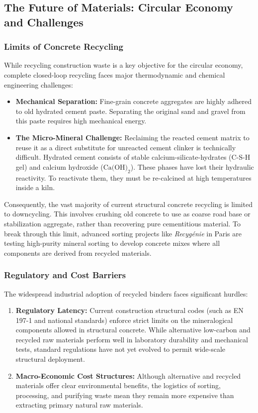 \subsection{The Future of Materials: Circular Economy and Challenges}

\subsubsection{Limits of Concrete Recycling}
While recycling construction waste is a key objective for the circular economy, complete closed-loop recycling faces major thermodynamic and chemical engineering challenges:
\begin{itemize}
    \item \textbf{Mechanical Separation:} Fine-grain concrete aggregates are highly adhered to old hydrated cement paste. Separating the original sand and gravel from this paste requires high mechanical energy.
    \item \textbf{The Micro-Mineral Challenge:} Reclaiming the reacted cement matrix to reuse it as a direct substitute for unreacted cement clinker is technically difficult. Hydrated cement consists of stable calcium-silicate-hydrates ($\text{C-S-H}$ gel) and calcium hydroxide ($\text{Ca(OH)}_2$). These phases have lost their hydraulic reactivity. To reactivate them, they must be re-calcined at high temperatures inside a kiln.
\end{itemize}
Consequently, the vast majority of current structural concrete recycling is limited to downcycling. This involves crushing old concrete to use as coarse road base or stabilization aggregate, rather than recovering pure cementitious material. To break through this limit, advanced sorting projects like \textit{Recygénie} in Paris are testing high-purity mineral sorting to develop concrete mixes where all components are derived from recycled materials.

\subsubsection{Regulatory and Cost Barriers}
The widespread industrial adoption of recycled binders faces significant hurdles:
\begin{enumerate}
    \item \textbf{Regulatory Latency:} Current construction structural codes (such as EN 197-1 and national standards) enforce strict limits on the mineralogical components allowed in structural concrete. While alternative low-carbon and recycled raw materials perform well in laboratory durability and mechanical tests, standard regulations have not yet evolved to permit wide-scale structural deployment.
    \item \textbf{Macro-Economic Cost Structures:} Although alternative and recycled materials offer clear environmental benefits, the logistics of sorting, processing, and purifying waste mean they remain more expensive than extracting primary natural raw materials.
\end{enumerate}

